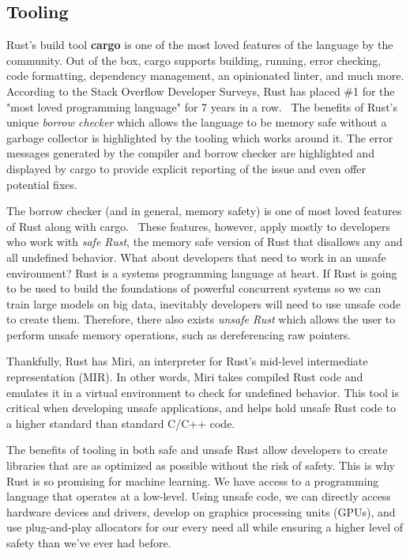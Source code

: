 \begin{multicols}{2}
\subsection{Tooling}
Rust's build tool \textbf{cargo} is one of the most loved features of the language by the community. Out of the box, cargo
supports building, running, error checking, code formatting, dependency management, an opinionated linter, and much more.
According to the Stack Overflow Developer Surveys, Rust has placed \#1 for the "most loved programming language" for 7 years
in a row.~\cite{stackoverflowdevelopersurvey2022} The benefits of Rust's unique \textit{borrow checker} which
allows the language to be memory safe without a garbage collector is highlighted by the tooling which works around it.
The error messages generated by the compiler and borrow checker are highlighted and displayed by cargo to provide explicit
reporting of the issue and even offer potential fixes.

The borrow checker (and in general, memory safety) is one of most loved features of Rust along with cargo.~\cite{rustlovestackoverflow}
These features, however, apply mostly to developers who work with \textit{safe Rust}, the memory safe version of Rust
that disallows any and all undefined behavior. What about developers that need to work in an unsafe environment? Rust is
a systems programming language at heart. If Rust is going to be used to build the foundations of powerful concurrent systems
so we can train large models on big data, inevitably developers will need to use unsafe code to create them. Therefore,
there also exists \textit{unsafe Rust} which allows the user to perform unsafe memory operations, such as dereferencing
raw pointers.

Thankfully, Rust has Miri, an interpreter for Rust's mid-level intermediate representation (MIR). In other words, Miri
takes compiled Rust code and emulates it in a virtual environment to check for undefined behavior. This tool is critical
when developing unsafe applications, and helps hold unsafe Rust code to a higher standard than standard C/C++ code.

The benefits of tooling in both safe and unsafe Rust allow developers to create libraries that are as optimized as possible
without the risk of safety. This is why Rust is so promising for machine learning. We have access to a programming language
that operates at a low-level. Using unsafe code, we can directly access hardware devices and drivers, develop on graphics
processing units (GPUs), and use plug-and-play allocators for our every need all while ensuring a higher level of safety
than we've ever had before.

\end{multicols}
